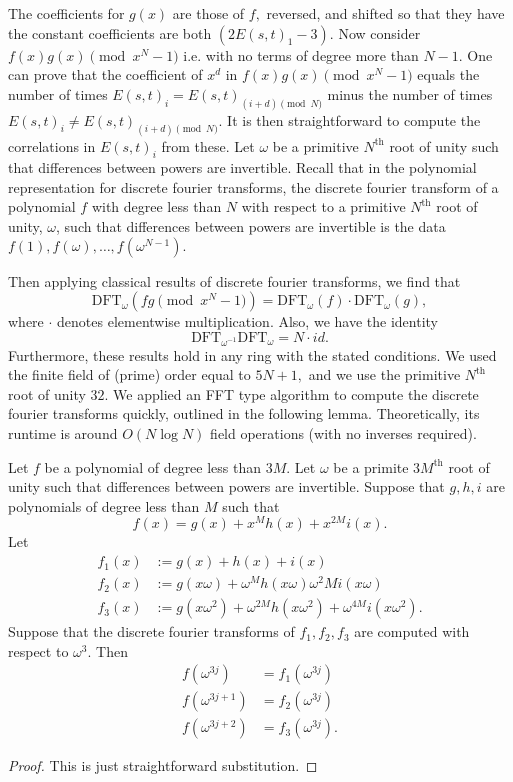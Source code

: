 \documentclass[11pt]{amsart} %
\begin{document}
The coefficients for $g(x)$ are those of $f,$ reversed, and shifted so that they have the constant coefficients are both $(2 E(s, t)_1 - 3).$
Now consider $f(x) g(x) \pmod{x^N-1}$ i.e. with no terms of degree more than $N-1.$ One can prove that the coefficient of $x^d$ in $f(x) g(x) \pmod{x^N - 1}$ equals the number of times $E(s,t)_i = E(s, t)_{(i+d) \pmod{N}}$ minus the number of times $E(s,t)_i \neq E(s, t)_{(i+d) \pmod{N}}$. It is then straightforward to compute the correlations in $E(s, t)_i$ from these.
Let $\omega$ be a primitive $N^{\text{th}}$ root of unity such that differences between powers are invertible. Recall that in the polynomial representation for discrete fourier transforms, the discrete fourier transform of a polynomial $f$ with degree less than $N$ with respect to a primitive $N^{\text{th}}$ root of unity, $\omega$, such that differences between powers are invertible is the data $f(1), f(\omega), \ldots, f(\omega^{N-1}).$

Then applying classical results of discrete fourier transforms, we find that
\[\text{DFT}_{\omega}(fg \pmod{x^N - 1})  = \text{DFT}_{\omega}(f) \cdot \text{DFT}_{\omega}(g),\]
where $\cdot$ denotes elementwise multiplication. Also, we have the identity 
\[ \text{DFT}_{\omega^{-1}} \text{DFT}_{\omega} = N \cdot id.\]
Furthermore, these results hold in any ring with the stated conditions. We used the finite field of (prime) order equal to $5N+1,$ and we use the primitive $N^{\text{th}}$ root of unity $32.$ We applied an FFT type algorithm to compute the discrete fourier transforms quickly, outlined in the following lemma. Theoretically, its runtime is around $O(N \log N)$ field operations (with no inverses required).
\begin{lemma}  Let $f$ be a polynomial of degree less than $3M.$ Let $\omega$ be a primite $3M^{\text{th}}$ root of unity such that differences between powers are invertible. Suppose that $g, h, i$ are polynomials of degree less than $M$ such that 
\[f(x) = g(x) + x^M h(x) + x^{2M} i(x).\]
 Let 
\begin{align*} f_1(x)&:= g(x) + h(x) + i(x)\\ f_2(x) &:= g(x \omega) + \omega^M h(x \omega) \omega^2M i(x \omega) \\ f_3(x) &:= g(x \omega^2) + \omega^{2M} h(x \omega^2) + \omega^{4M} i(x \omega^2). \end{align*}
Suppose that the discrete fourier transforms of $f_1, f_2, f_3$ are computed with respect to $\omega^3.$ Then
\begin{align*} f(\omega^{3j}) &= f_1(\omega^{3j}) \\ f(\omega^{3j+1}) &= f_2(\omega^{3j}) \\ f(\omega^{3j+2}) &= f_3(\omega^{3j}). \end{align*}
\end{lemma}
\begin{proof} This is just straightforward substitution. \end{proof}
\end{document}
